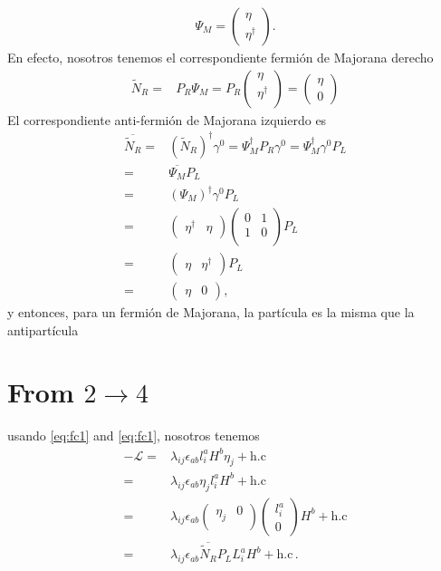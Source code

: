 \begin{align}
\Psi_M
=\begin{pmatrix}
\eta\\
\eta^\dagger
\end{pmatrix}.
\end{align}
En efecto, nosotros tenemos el correspondiente fermión de Majorana derecho
\begin{align}
\widetilde{N}_R=&P_R \Psi_M=P_R\begin{pmatrix}
\eta\\
\eta^{\dagger}\\
\end{pmatrix}=
\begin{pmatrix}
\eta\\
0
\end{pmatrix}
\end{align}
El correspondiente anti-fermión de Majorana izquierdo es
\begin{align}
\label{eq:fc2}
\overline{\widetilde{N}_R}=&(\widetilde{N}_R)^\dagger\gamma^0=\Psi_M^\dagger P_R \gamma^0
=\Psi_M^\dagger  \gamma^0 P_L \nonumber\\
=&\overline{\Psi_M}P_L \nonumber\\
=&\left(\Psi_M\right)^\dagger \gamma^0 P_L\nonumber\\
=&\begin{pmatrix}
\eta^\dagger & \eta
\end{pmatrix}\begin{pmatrix}
0 & 1\\
1& 0\\
\end{pmatrix}P_L\nonumber\\
=&\begin{pmatrix}
\eta & \eta^\dagger
\end{pmatrix}P_L\nonumber\\
=&\begin{pmatrix}
\eta & 0
\end{pmatrix},
\end{align}
y entonces, para un fermión de Majorana, la partícula es la misma que la antipartícula 
\section{From $2\to 4$}
usando \eqref{eq:fc1} and \eqref{eq:fc1}, nosotros tenemos 
\begin{align}
-\mathcal{L}=&\lambda_{ij}\epsilon_{ab} l^a_i H^b \eta_j+\text{h.c}\nonumber\\
=&\lambda_{ij}\epsilon_{ab}\eta_j l^a_i H^b +\text{h.c}\nonumber\\
=&\lambda_{ij}\epsilon_{ab}\begin{pmatrix}
\eta_j & 0\\
\end{pmatrix} \begin{pmatrix}
l^a_i\\
0
\end{pmatrix} H^b +\text{h.c}\nonumber\\
=&\lambda_{ij}\epsilon_{ab} \overline{\widetilde{N}_R}P_LL^a_i H^b +\text{h.c}\,.
\end{align}

